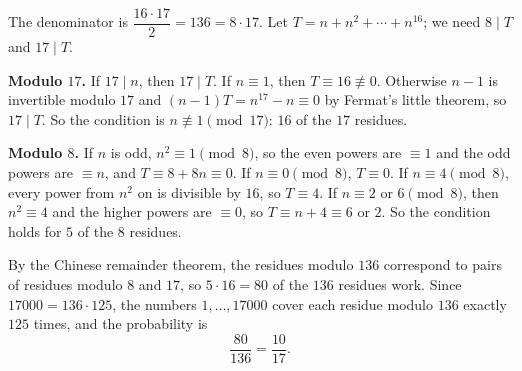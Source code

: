 The denominator is $\dfrac{16\cdot17}2=136=8\cdot17$. Let $T=n+n^2+\cdots+n^{16}$; we need $8\mid T$ and $17\mid T$.

\textbf{Modulo $17$.} If $17\mid n$, then $17\mid T$. If $n\equiv1$, then $T\equiv16\not\equiv0$. Otherwise $n-1$ is invertible modulo $17$ and $(n-1)T=n^{17}-n\equiv0$ by Fermat's little theorem, so $17\mid T$. So the condition is $n\not\equiv1\pmod{17}$: $16$ of the $17$ residues.

\textbf{Modulo $8$.} If $n$ is odd, $n^2\equiv1\pmod8$, so the even powers are $\equiv1$ and the odd powers are $\equiv n$, and $T\equiv8+8n\equiv0$. If $n\equiv0\pmod8$, $T\equiv0$. If $n\equiv4\pmod8$, every power from $n^2$ on is divisible by $16$, so $T\equiv4$. If $n\equiv2$ or $6\pmod8$, then $n^2\equiv4$ and the higher powers are $\equiv0$, so $T\equiv n+4\equiv6$ or $2$. So the condition holds for $5$ of the $8$ residues.

By the Chinese remainder theorem, the residues modulo $136$ correspond to pairs of residues modulo $8$ and $17$, so $5\cdot16=80$ of the $136$ residues work. Since $17000=136\cdot125$, the numbers $1,\dots,17000$ cover each residue modulo $136$ exactly $125$ times, and the probability is
\[\dfrac{80}{136}=\boxed{\dfrac{10}{17}}.\]
